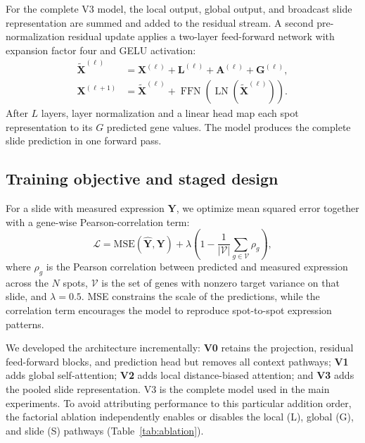 \documentclass[10pt,twocolumn,letterpaper]{article}
\begin{document}
For the complete V3 model, the local output, global output, and broadcast slide representation are
summed and added to the residual stream. A second pre-normalization residual update applies a
two-layer feed-forward network with expansion factor four and GELU activation:
\begin{align}
\widetilde{\mathbf{X}}^{(\ell)}
  &=\mathbf{X}^{(\ell)}+\mathbf{L}^{(\ell)}+\mathbf{A}^{(\ell)}+\mathbf{G}^{(\ell)},\\
\mathbf{X}^{(\ell+1)}
  &=\widetilde{\mathbf{X}}^{(\ell)}+
    \operatorname{FFN}\!\left(\operatorname{LN}(\widetilde{\mathbf{X}}^{(\ell)})\right).
\end{align}
After $L$ layers, layer normalization and a linear head map each spot representation to its $G$
predicted gene values. The model produces the complete slide prediction in one forward pass.

\subsection{Training objective and staged design}
\label{sec:loss}
For a slide with measured expression $\mathbf{Y}$, we optimize mean squared error together with a
gene-wise Pearson-correlation term:
\begin{equation}
\mathcal{L}=\mathrm{MSE}(\hat{\mathbf{Y}},\mathbf{Y})
+ \lambda\left(1-\frac{1}{|\mathcal{V}|}\sum_{g\in\mathcal{V}}\rho_g\right),
\end{equation}
where $\rho_g$ is the Pearson correlation between predicted and measured expression across the $N$
spots, $\mathcal{V}$ is the set of genes with nonzero target variance on that slide, and
$\lambda=0.5$. MSE constrains the scale of the predictions, while the correlation term encourages
the model to reproduce spot-to-spot expression patterns.

We developed the architecture incrementally: \textbf{V0} retains the projection, residual
feed-forward blocks, and prediction head but removes all context pathways; \textbf{V1} adds global
self-attention; \textbf{V2} adds local distance-biased attention; and \textbf{V3} adds the pooled
slide representation. V3 is the complete model used in the main experiments. To avoid attributing
performance to this particular addition order, the factorial ablation independently enables or
disables the local (L), global (G), and slide (S) pathways (Table~\ref{tab:ablation}).
\end{document}
